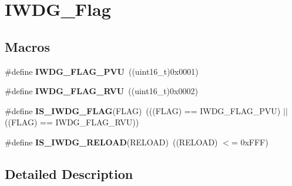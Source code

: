 \hypertarget{group___i_w_d_g___flag}{\section{I\-W\-D\-G\-\_\-\-Flag}
\label{group___i_w_d_g___flag}
}
\subsection*{Macros}
\begin{DoxyCompactItemize}
\item 
\hypertarget{group___i_w_d_g___flag_gae20afcf399fad1534e79a8d30ea86c9c}{\#define {\bfseries I\-W\-D\-G\-\_\-\-F\-L\-A\-G\-\_\-\-P\-V\-U}~((uint16\-\_\-t)0x0001)}\label{group___i_w_d_g___flag_gae20afcf399fad1534e79a8d30ea86c9c}

\item 
\hypertarget{group___i_w_d_g___flag_ga3731bf2711c234ffe5b405fb6634ebca}{\#define {\bfseries I\-W\-D\-G\-\_\-\-F\-L\-A\-G\-\_\-\-R\-V\-U}~((uint16\-\_\-t)0x0002)}\label{group___i_w_d_g___flag_ga3731bf2711c234ffe5b405fb6634ebca}

\item 
\hypertarget{group___i_w_d_g___flag_ga5be9ae9ba267cf09a00523ef3e219293}{\#define {\bfseries I\-S\-\_\-\-I\-W\-D\-G\-\_\-\-F\-L\-A\-G}(F\-L\-A\-G)~(((F\-L\-A\-G) == I\-W\-D\-G\-\_\-\-F\-L\-A\-G\-\_\-\-P\-V\-U) $|$$|$ ((F\-L\-A\-G) == I\-W\-D\-G\-\_\-\-F\-L\-A\-G\-\_\-\-R\-V\-U))}\label{group___i_w_d_g___flag_ga5be9ae9ba267cf09a00523ef3e219293}

\item 
\hypertarget{group___i_w_d_g___flag_ga7c319e96bded8e3c38c6a42a1b335c68}{\#define {\bfseries I\-S\-\_\-\-I\-W\-D\-G\-\_\-\-R\-E\-L\-O\-A\-D}(R\-E\-L\-O\-A\-D)~((R\-E\-L\-O\-A\-D) $<$= 0x\-F\-F\-F)}\label{group___i_w_d_g___flag_ga7c319e96bded8e3c38c6a42a1b335c68}

\end{DoxyCompactItemize}


\subsection{Detailed Description}
